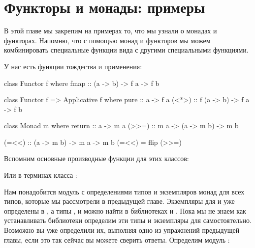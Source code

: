 \chapter{Функторы и монады: примеры}

В этой главе мы закрепим на примерах то, что мы узнали о монадах и
функторах. Напомню, что с помощью монад и функторов мы можем
комбинировать специальные функции вида  с другими
специальными функциями.

У нас есть функции тождества и применения:


\begin{code}
class Functor f where
    fmap :: (a -> b) -> f a -> f b

class Functor f => Applicative f where
    pure    :: a -> f a
    (<*>)   :: f (a -> b) -> f a -> f b

class Monad m where
    return  :: a -> m a
    (>>=)   :: m a -> (a -> m b) -> m b

(=<<) :: (a -> m b) -> m a -> m b
(=<<) = flip (>>=)
\end{code}

Вспомним основные производные функции для этих классов:

Или в терминах класса :



Нам понадобится модуль с определениями типов и экземпляров монад для
всех типов, которые мы рассмотрели в предыдущей главе. Экземпляры для
\In{[]} и  уже определены в , а типы ,
 и  можно найти в библиотеках  и
. Пока мы не знаем как устанавливать библиотеки
определим эти типы и экземпляры для  самостоятельно. Возможно
вы уже определили их, выполняя одно из упражнений предыдущей главы, если
это так сейчас вы можете сверить ответы. Определим модуль :


